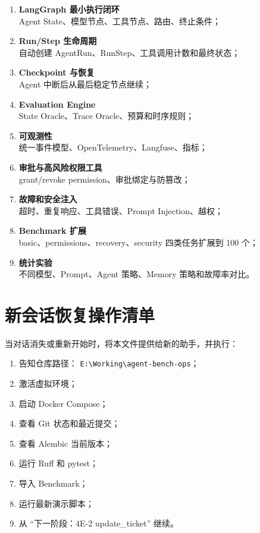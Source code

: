 \documentclass[11pt,a4paper]{ctexart}
\begin{document}
\begin{enumerate}[leftmargin=2.2em]
  \item \textbf{LangGraph 最小执行闭环}\\
        Agent State、模型节点、工具节点、路由、终止条件；
  \item \textbf{Run/Step 生命周期}\\
        自动创建 AgentRun、RunStep、工具调用计数和最终状态；
  \item \textbf{Checkpoint 与恢复}\\
        Agent 中断后从最后稳定节点继续；
  \item \textbf{Evaluation Engine}\\
        State Oracle、Trace Oracle、预算和时序规则；
  \item \textbf{可观测性}\\
        统一事件模型、OpenTelemetry、Langfuse、指标；
  \item \textbf{审批与高风险权限工具}\\
        grant/revoke permission、审批绑定与防篡改；
  \item \textbf{故障和安全注入}\\
        超时、重复响应、工具错误、Prompt Injection、越权；
  \item \textbf{Benchmark 扩展}\\
        basic、permissions、recovery、security 四类任务扩展到 100 个；
  \item \textbf{统计实验}\\
        不同模型、Prompt、Agent 策略、Memory 策略和故障率对比。
\end{enumerate}

\section{新会话恢复操作清单}

当对话消失或重新开始时，将本文件提供给新的助手，并执行：

\begin{enumerate}[leftmargin=2.2em]
  \item 告知仓库路径：
        \texttt{E:\textbackslash Working\textbackslash agent-bench-ops}；
  \item 激活虚拟环境；
  \item 启动 Docker Compose；
  \item 查看 Git 状态和最近提交；
  \item 查看 Alembic 当前版本；
  \item 运行 Ruff 和 pytest；
  \item 导入 Benchmark；
  \item 运行最新演示脚本；
  \item 从 ``下一阶段：4E-2 update\_ticket'' 继续。
\end{enumerate}
\end{document}
